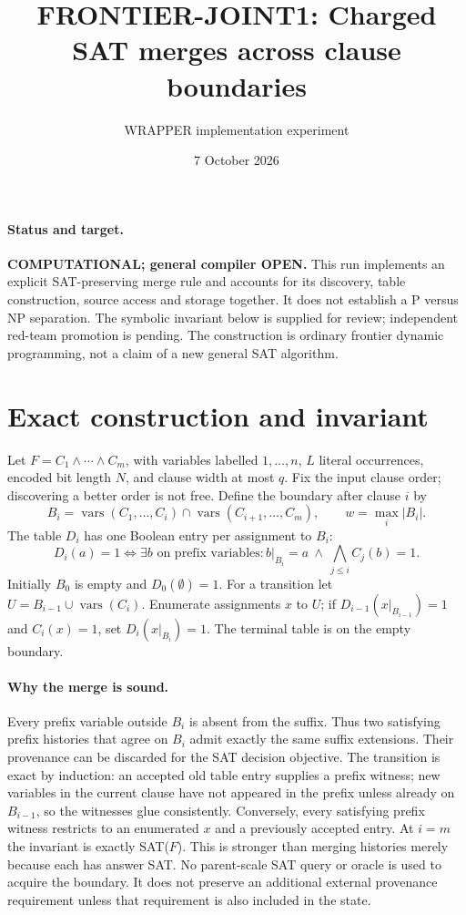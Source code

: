 \documentclass[11pt]{article}
\title{FRONTIER-JOINT1: Charged SAT merges across clause boundaries}
\author{WRAPPER implementation experiment}
\date{7 October 2026}
\begin{document}
\maketitle
\paragraph{Status and target.}
\textbf{COMPUTATIONAL; general compiler OPEN.} This run implements an explicit
SAT-preserving merge rule and accounts for its discovery, table construction,
source access and storage together. It does not establish a P versus NP
separation. The symbolic invariant below is supplied for review; independent
red-team promotion is pending. The construction is ordinary frontier dynamic
programming, not a claim of a new general SAT algorithm.

\section{Exact construction and invariant}
Let $F=C_1\land\cdots\land C_m$, with variables labelled $1,\ldots,n$,
$L$ literal occurrences, encoded bit length $N$, and clause width at most $q$.
Fix the input clause order; discovering a better order is not free.
Define the boundary after clause $i$ by
\[
 B_i=\operatorname{vars}(C_1,\ldots,C_i)
       \cap\operatorname{vars}(C_{i+1},\ldots,C_m),\qquad
 w=\max_i|B_i|.
\]
The table $D_i$ has one Boolean entry per assignment to $B_i$:
\[
 D_i(a)=1\iff \exists b\text{ on prefix variables}:
 b|_{B_i}=a\ \land\ \bigwedge_{j\le i}C_j(b)=1.
\]
Initially $B_0$ is empty and $D_0(\emptyset)=1$.
For a transition let $U=B_{i-1}\cup\operatorname{vars}(C_i)$.
Enumerate assignments $x$ to $U$; if $D_{i-1}(x|_{B_{i-1}})=1$
and $C_i(x)=1$, set $D_i(x|_{B_i})=1$.
The terminal table is on the empty boundary.

\paragraph{Why the merge is sound.}
Every prefix variable outside $B_i$ is absent from the suffix. Thus two
satisfying prefix histories that agree on $B_i$ admit exactly the same suffix
extensions. Their provenance can be discarded for the SAT decision objective.
The transition is exact by induction: an accepted old table entry supplies a
prefix witness; new variables in the current clause have not appeared in the
prefix unless already on $B_{i-1}$, so the witnesses glue consistently.
Conversely, every satisfying prefix witness restricts to an enumerated $x$
and a previously accepted entry. At $i=m$ the invariant is exactly SAT($F$).
This is stronger than merging histories merely because each has answer SAT.
No parent-scale SAT query or oracle is used to acquire the boundary.
It does not preserve an additional external provenance requirement unless
that requirement is also included in the state.
\end{document}
